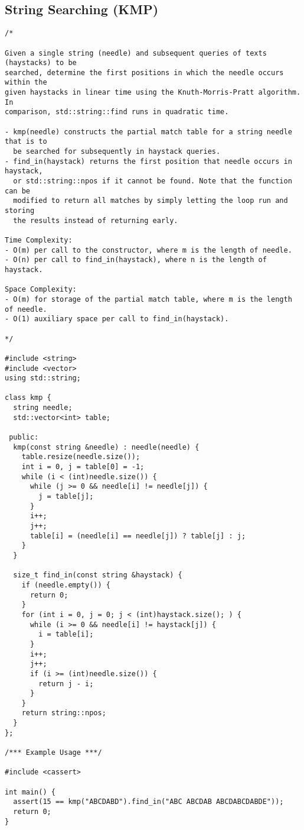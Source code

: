 \subsection{String Searching (KMP)}
\begin{lstlisting}
/*

Given a single string (needle) and subsequent queries of texts (haystacks) to be
searched, determine the first positions in which the needle occurs within the
given haystacks in linear time using the Knuth-Morris-Pratt algorithm. In
comparison, std::string::find runs in quadratic time.

- kmp(needle) constructs the partial match table for a string needle that is to
  be searched for subsequently in haystack queries.
- find_in(haystack) returns the first position that needle occurs in haystack,
  or std::string::npos if it cannot be found. Note that the function can be
  modified to return all matches by simply letting the loop run and storing
  the results instead of returning early.

Time Complexity:
- O(m) per call to the constructor, where m is the length of needle.
- O(n) per call to find_in(haystack), where n is the length of haystack.

Space Complexity:
- O(m) for storage of the partial match table, where m is the length of needle.
- O(1) auxiliary space per call to find_in(haystack).

*/

#include <string>
#include <vector>
using std::string;

class kmp {
  string needle;
  std::vector<int> table;

 public:
  kmp(const string &needle) : needle(needle) {
    table.resize(needle.size());
    int i = 0, j = table[0] = -1;
    while (i < (int)needle.size()) {
      while (j >= 0 && needle[i] != needle[j]) {
        j = table[j];
      }
      i++;
      j++;
      table[i] = (needle[i] == needle[j]) ? table[j] : j;
    }
  }

  size_t find_in(const string &haystack) {
    if (needle.empty()) {
      return 0;
    }
    for (int i = 0, j = 0; j < (int)haystack.size(); ) {
      while (i >= 0 && needle[i] != haystack[j]) {
        i = table[i];
      }
      i++;
      j++;
      if (i >= (int)needle.size()) {
        return j - i;
      }
    }
    return string::npos;
  }
};

/*** Example Usage ***/

#include <cassert>

int main() {
  assert(15 == kmp("ABCDABD").find_in("ABC ABCDAB ABCDABCDABDE"));
  return 0;
}
\end{lstlisting}
